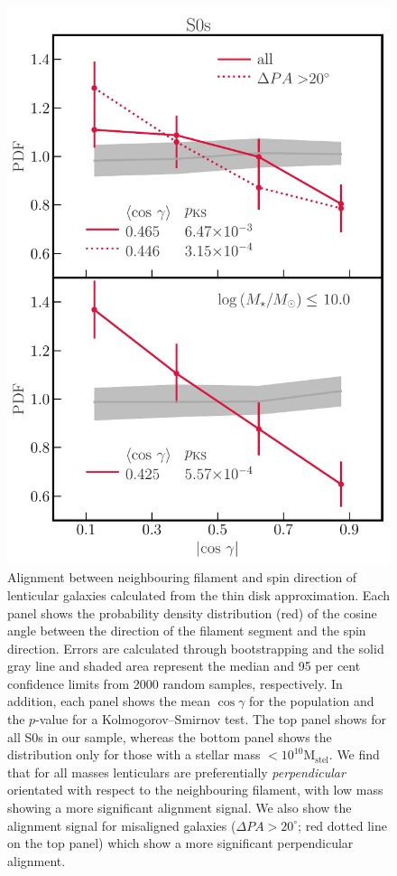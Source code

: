 \begin{figure}
    \centering
    \includegraphics[width=0.65\linewidth]{thesis/latex/cw_spin/spin_fil_S0s_2in1.pdf}
    \caption{Alignment between neighbouring filament and spin direction of lenticular galaxies calculated from the thin disk approximation. Each panel shows the probability density distribution (red) of the cosine angle between the direction of the filament segment and the spin direction. Errors are calculated through bootstrapping and the solid gray line and shaded area represent the median and 95 per cent confidence limits from 2000 random samples, respectively. In addition, each panel shows the mean $\cos \gamma$ for the population and the $p$-value for a Kolmogorov--Smirnov test. The top panel shows for all S0s in our sample, whereas the bottom panel shows the distribution only for those with a stellar mass $\mathrm{< 10^{10} M_{stel}}$. We find that for all masses lenticulars are preferentially \textit{perpendicular} orientated with respect to the neighbouring filament, with low mass showing a more significant alignment signal. We also show the alignment signal for misaligned galaxies ($\Delta PA > 20^{\circ}$; red dotted line on the top panel) which show a more significant perpendicular alignment.}
    \label{fig:s0_spin_alignment}
\end{figure}

